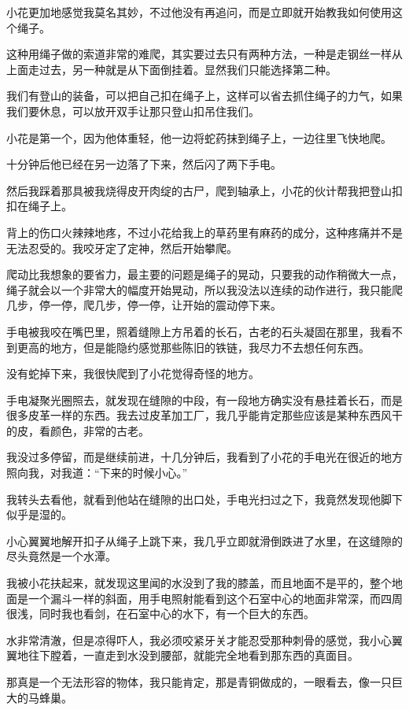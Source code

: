 小花更加地感觉我莫名其妙，不过他没有再追问，而是立即就开始教我如何使用这个绳子。

这种用绳子做的索道非常的难爬，其实要过去只有两种方法，一种是走钢丝一样从上面走过去，另一种就是从下面倒挂着。显然我们只能选择第二种。

我们有登山的装备，可以把自己扣在绳子上，这样可以省去抓住绳子的力气，如果我们要休息，可以放开双手让那只登山扣吊住我们。

小花是第一个，因为他体重轻，他一边将蛇药抹到绳子上，一边往里飞快地爬。

十分钟后他已经在另一边落了下来，然后闪了两下手电。

然后我踩着那具被我烧得皮开肉绽的古尸，爬到轴承上，小花的伙计帮我把登山扣扣在绳子上。

背上的伤口火辣辣地疼，不过小花给我上的草药里有麻药的成分，这种疼痛并不是无法忍受的。我咬牙定了定神，然后开始攀爬。

爬动比我想象的要省力，最主要的问题是绳子的晃动，只要我的动作稍微大一点，绳子就会以一个非常大的幅度开始晃动，所以我没法以连续的动作进行，我只能爬几步，停一停，爬几步，停一停，让开始的震动停下来。

手电被我咬在嘴巴里，照着缝隙上方吊着的长石，古老的石头凝固在那里，我看不到更高的地方，但是能隐约感觉那些陈旧的铁链，我尽力不去想任何东西。

没有蛇掉下来，我很快爬到了小花觉得奇怪的地方。

手电凝聚光圈照去，就发现在缝隙的中段，有一段地方确实没有悬挂着长石，而是很多皮革一样的东西。我去过皮革加工厂，我几乎能肯定那些应该是某种东西风干的皮，看颜色，非常的古老。

我没过多停留，而是继续前进，十几分钟后，我看到了小花的手电光在很近的地方照向我，对我道：“下来的时候小心。”

我转头去看他，就看到他站在缝隙的出口处，手电光扫过之下，我竟然发现他脚下似乎是湿的。

小心翼翼地解开扣子从绳子上跳下来，我几乎立即就滑倒跌进了水里，在这缝隙的尽头竟然是一个水潭。

我被小花扶起来，就发现这里闻的水没到了我的膝盖，而且地面不是平的，整个地面是一个漏斗一样的斜面，用手电照射能看到这个石室中心的地面非常深，而四周很浅，同时我也看剑，在石室中心的水下，有一个巨大的东西。

水非常清澈，但是凉得吓人，我必须咬紧牙关才能忍受那种刺骨的感觉，我小心翼翼地往下膛着，一直走到水没到腰部，就能完全地看到那东西的真面目。

那真是一个无法形容的物体，我只能肯定，那是青铜做成的，一眼看去，像一只巨大的马蜂巢。

